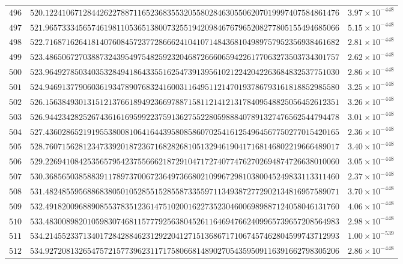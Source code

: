 \documentclass[12pt,reqno]{amsart}
\theoremstyle{remark}
\begin{document}
\begin{longtable}{clc}
$496$ & $520.1224106712844262278871165236835532055802846305506207019997407584861476$ & $3.97\times 10^{-448}$ \\
$497$ & $521.9657333456574619811053651380073255194209846767965208277805155494685066$ & $5.15\times 10^{-448}$ \\
$498$ & $522.7168716264181407608457237728666241041071484368104989757952356938461682$ & $2.81\times 10^{-448}$ \\
$499$ & $523.4865067270388732439549754825923204687266606594226177063273503734301757$ & $2.62\times 10^{-448}$ \\
$500$ & $523.9649278503403532849418643355162547391395610212242042263684832537751030$ & $2.86\times 10^{-448}$ \\
$501$ & $524.9469137790603619347890768324160031164951121470193786793161818852985580$ & $3.25\times 10^{-448}$ \\
$502$ & $526.1563849301315121376618949236697887158112141213178409548825056452612351$ & $3.26\times 10^{-448}$ \\
$503$ & $526.9442342825267436161695992237591362755228059888407891327476562544794478$ & $3.01\times 10^{-448}$ \\
$504$ & $527.4360286521919553800810641644395808586070254161254964567750277015420165$ & $2.36\times 10^{-448}$ \\
$505$ & $528.7607156281234733920187236716828268105132946190417168146802219666489017$ & $3.40\times 10^{-448}$ \\
$506$ & $529.2269410842535657954237556662187291047172740774762702694874726638010060$ & $3.05\times 10^{-448}$ \\
$507$ & $530.3685650385883911789737006723649736680210996729810380045249833113311460$ & $2.37\times 10^{-448}$ \\
$508$ & $531.4824855956886838050105285515285587335597113493872772902134816957589071$ & $3.70\times 10^{-448}$ \\
$509$ & $532.4918200968890855378351236147510200162273523046006989887124058046131760$ & $4.06\times 10^{-448}$ \\
$510$ & $533.4830089820105983074681157779256380452611646947662409965739657208564983$ & $2.98\times 10^{-448}$ \\
$511$ & $534.2145523371340172842884623129220412715136867171067457462804599743712993$ & $1.00\times 10^{-539}$ \\
$512$ & $534.9272081326547572157739623117175806681489027054359509116391662798305206$ & $2.86\times 10^{-448}$ \\

\end{longtable}
\end{document}
